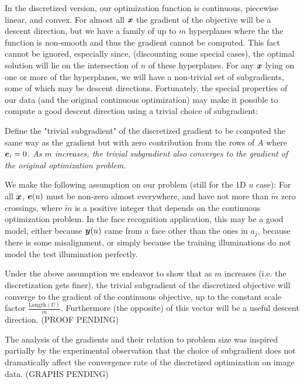 \documentclass[12pt,journal,draftcls,letterpaper,onecolumn]{IEEEtran}
\begin{document}
In the discretized version, our optimization function is continuous, piecewise linear, and convex.  For almost all ${\boldsymbol{x}}$ the gradient of the objective will be a descent direction, but we have a family of up to $m$ hyperplanes where the the function is non-smooth and thus the gradient cannot be computed.  This fact cannot be ignored, especially since, (discounting some special cases), the optimal solution will lie on the intersection of $n$ of these hyperplanes.  For any ${\boldsymbol{x}}$ lying on one or more of the hyperplanes, we will have a non-trivial set of subgradients, some of which may be descent directions.  Fortunately, the special properties of our data (and the original continuous optimization) may make it possible to compute a good descent direction using a trivial choice of subgradient:

Define the "trivial subgradient" of the discretized gradient to be computed the same way as the gradient but with zero contribution from the rows of $A$ where $\boldsymbol{e}_i=0$. {\em As $m$ increases, the trivial subgradient also converges to the gradient of the original optimization problem.} 

We make the following assumption on our problem (still for the 1D $u$ case):  For all ${\boldsymbol{x}}$, $\boldsymbol{e}(u)$ must be non-zero almost everywhere, and have not more than $\tilde m$ zero crossings, where $\tilde m$ is a positive integer that depends on the continuous optimization problem.  In the face recognition application, this may be a good model, either because ${\boldsymbol{y}}(u)$ came from a face other than the ones in $a_j$, because there is some misalignment, or simply because the training illuminations do not model the test illumination perfectly.

Under the above assumption we endeavor to show that as $m$ increases (i.e. the discretization gets finer), the trivial subgradient of the discretized objective will converge to the gradient of the continuous objective, up to the constant scale factor $\frac{\textrm{Length}(U)}{m}$.  Furthermore (the opposite) of this vector will be a useful descent direction.  (PROOF PENDING)

The analysis of the gradients and their relation to problem size was inspired partially by the experimental observation that the choice of subgradient does not dramatically affect the convergence rate of the discretized optimization on image data. (GRAPHS PENDING)


\end{document}
